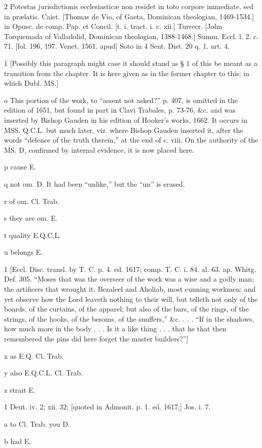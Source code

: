 2
Potestas jurisdictionis ecclesiasticæ non residet in toto corpore immediate, sed in prælatis. Caiet. [Thomas de Vio, of Gaeta, Dominican theologian, 1469-1534.] in Opusc. de comp. Pap. et Concil. [t. i. tract. i. c. xii.] Turrecr. [John Torquemada of Valladolid, Dominican theologian, 1388-1468.] Summ. Eccl. l. 2. c. 71. [fol. 196, 197. Venet. 1561. apud] Soto in 4 Sent. Dist. 20 q. 1. art. 4.

1
[Possibly this paragraph might case it should stand as § 1 of this be meant as a transition from the chapter. It is here given as in the former chapter to this: in which Dubl. MS.]

o
This portion of the work, to “assent not asked?” p. 407, is omitted in the edition of 1651, but found in part in Clavi Trabales, p. 73-76, &c. and was inserted by Bishop Gauden in his edition of Hooker’s works, 1662. It occurs in MSS. Q.C.L. but much later, viz. where Bishop Gauden inserted it, after the words “defence of the truth therein,” at the end of c. viii. On the authority of the MS. D, confirmed by internal evidence, it is now placed here.

p
cause E.

q
not om. D. It had been “unlike,” but the “un” is erased.

r
of om. Cl. Trab.

s
they are om. E.

t
quality E.Q.C.L.

u
belongs E.

1
[Eccl. Disc. transl. by T. C. p. 4. ed. 1617; comp. T. C. i. 84. al. 63. ap. Whitg. Def. 305. “Moses that was the overseer of the work was a wise and a godly man; the artificers that wrought it, Bezaleel and Aholiab, most cunning workmen: and yet observe how the Lord leaveth nothing to their will, but telleth not only of the boards, of the curtains, of the apparel; but also of the bars, of the rings, of the strings, of the hooks, of the besoms, of the snuffers,” &c. . . . “If in the shadows, how much more in the body . . . Is it a like thing . . . that he that then remembered the pins did here forget the master builders?”]

x
as E.Q. Cl. Trab.

y
also E.Q.C.L. Cl. Trab.

z
strait E.

1
Deut. iv. 2; xii. 32; [quoted in Admonit. p. 1. ed. 1617;] Jos. i. 7.

a
to Cl. Trab. you D.

b
had E.

